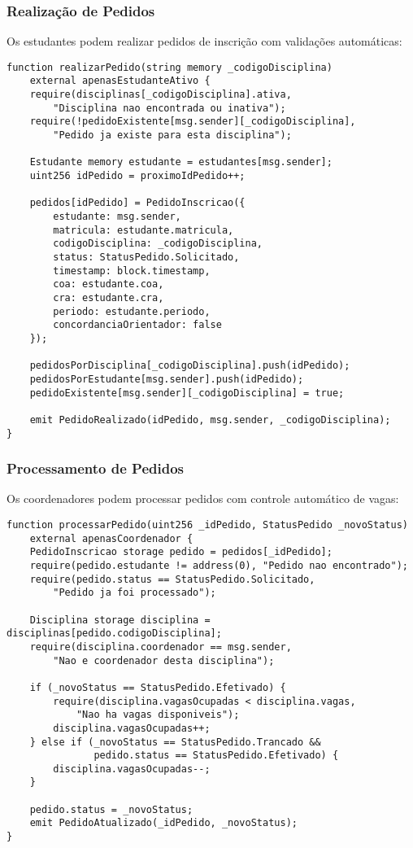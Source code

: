 \documentclass[12pt,a4paper]{article}
\begin{document}
\subsubsection{Realização de Pedidos}

Os estudantes podem realizar pedidos de inscrição com validações automáticas:

\begin{lstlisting}[caption=Realização de Pedido]
function realizarPedido(string memory _codigoDisciplina) 
    external apenasEstudanteAtivo {
    require(disciplinas[_codigoDisciplina].ativa, 
        "Disciplina nao encontrada ou inativa");
    require(!pedidoExistente[msg.sender][_codigoDisciplina], 
        "Pedido ja existe para esta disciplina");
    
    Estudante memory estudante = estudantes[msg.sender];
    uint256 idPedido = proximoIdPedido++;
    
    pedidos[idPedido] = PedidoInscricao({
        estudante: msg.sender,
        matricula: estudante.matricula,
        codigoDisciplina: _codigoDisciplina,
        status: StatusPedido.Solicitado,
        timestamp: block.timestamp,
        coa: estudante.coa,
        cra: estudante.cra,
        periodo: estudante.periodo,
        concordanciaOrientador: false
    });
    
    pedidosPorDisciplina[_codigoDisciplina].push(idPedido);
    pedidosPorEstudante[msg.sender].push(idPedido);
    pedidoExistente[msg.sender][_codigoDisciplina] = true;
    
    emit PedidoRealizado(idPedido, msg.sender, _codigoDisciplina);
}
\end{lstlisting}

\subsubsection{Processamento de Pedidos}

Os coordenadores podem processar pedidos com controle automático de vagas:

\begin{lstlisting}[caption=Processamento de Pedido]
function processarPedido(uint256 _idPedido, StatusPedido _novoStatus) 
    external apenasCoordenador {
    PedidoInscricao storage pedido = pedidos[_idPedido];
    require(pedido.estudante != address(0), "Pedido nao encontrado");
    require(pedido.status == StatusPedido.Solicitado, 
        "Pedido ja foi processado");
    
    Disciplina storage disciplina = disciplinas[pedido.codigoDisciplina];
    require(disciplina.coordenador == msg.sender, 
        "Nao e coordenador desta disciplina");
    
    if (_novoStatus == StatusPedido.Efetivado) {
        require(disciplina.vagasOcupadas < disciplina.vagas, 
            "Nao ha vagas disponiveis");
        disciplina.vagasOcupadas++;
    } else if (_novoStatus == StatusPedido.Trancado && 
               pedido.status == StatusPedido.Efetivado) {
        disciplina.vagasOcupadas--;
    }
    
    pedido.status = _novoStatus;
    emit PedidoAtualizado(_idPedido, _novoStatus);
}
\end{lstlisting}
\end{document}
